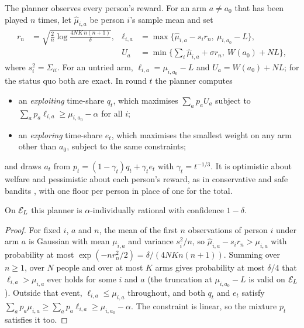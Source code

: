 The planner observes every person's reward. For an arm $a\neq a_0$ that has been played $n$ times, let $\hat\mu_{i,a}$ be person $i$'s sample mean and set
\begin{align*}
  r_n&=\sqrt{\frac{2}{n}\log\frac{4NK\,n(n+1)}{\delta}}, &
  \ell_{i,a}&=\max\{\hat\mu_{i,a}-s_ir_n,\ \mu_{i,a_0}-L\},\\
  && U_a&=\min\Big\{\textstyle\sum_i\hat\mu_{i,a}+\sigma r_n,\ W(a_0)+NL\Big\},
\end{align*}
where $s_i^2=\Sigma_{ii}$. For an untried arm, $\ell_{i,a}=\mu_{i,a_0}-L$ and $U_a=W(a_0)+NL$; for the status quo both are exact. In round $t$ the planner computes
\begin{itemize}[leftmargin=*,itemsep=1pt]
  \item an \emph{exploiting} time-share $q_t$, which maximises $\sum_ap_aU_a$ subject to $\sum_ap_a\ell_{i,a}\ge\mu_{i,a_0}-\alpha$ for all $i$;
  \item an \emph{exploring} time-share $e_t$, which maximises the smallest weight on any arm other than $a_0$, subject to the same constraints;
\end{itemize}
and draws $a_t$ from $p_t=(1-\gamma_t)q_t+\gamma_te_t$ with $\gamma_t=t^{-1/3}$. It is optimistic about welfare and pessimistic about each person's reward, as in conservative and safe bandits \citep{wu2016,amani2019,moradipari2020}, with one floor per person in place of one for the total.

\begin{proposition}[Safety]\label{prop:safe}
On $\mathcal{E}_L$ this planner is $\alpha$-individually rational with confidence $1-\delta$.
\end{proposition}

\begin{proof}
For fixed $i$, $a$ and $n$, the mean of the first $n$ observations of person $i$ under arm $a$ is Gaussian with mean $\mu_{i,a}$ and variance $s_i^2/n$, so $\hat\mu_{i,a}-s_ir_n>\mu_{i,a}$ with probability at most $\exp(-nr_n^2/2)=\delta/(4NKn(n+1))$. Summing over $n\ge1$, over $N$ people and over at most $K$ arms gives probability at most $\delta/4$ that $\ell_{i,a}>\mu_{i,a}$ ever holds for some $i$ and $a$ (the truncation at $\mu_{i,a_0}-L$ is valid on $\mathcal{E}_L$). Outside that event, $\ell_{i,a}\le\mu_{i,a}$ throughout, and both $q_t$ and $e_t$ satisfy $\sum_ap_a\mu_{i,a}\ge\sum_ap_a\ell_{i,a}\ge\mu_{i,a_0}-\alpha$. The constraint is linear, so the mixture $p_t$ satisfies it too.
\end{proof}

